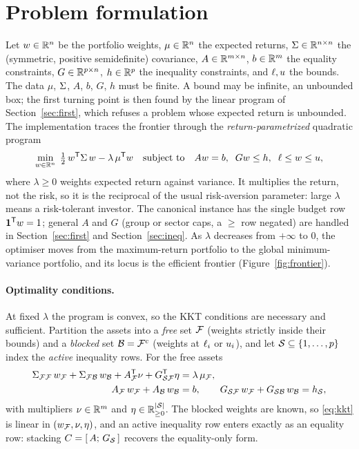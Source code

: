 \section{Problem formulation}
\label{sec:problem}

Let $w\in\mathbb{R}^n$ be the portfolio weights, $\mu\in\mathbb{R}^n$ the expected returns,
$\Sigma\in\mathbb{R}^{n\times n}$ the (symmetric, positive semidefinite) covariance,
$A\in\mathbb{R}^{m\times n}$, $b\in\mathbb{R}^m$ the equality constraints, $G\in\mathbb{R}^{p\times n}$,
$h\in\mathbb{R}^p$ the inequality constraints, and $\ell,u$ the bounds. The data $\mu$,
$\Sigma$, $A$, $b$, $G$, $h$ must be finite. A bound may be infinite, an unbounded box;
the first turning point is then found by the linear program of Section~\ref{sec:first}, which
refuses a problem whose expected return is unbounded. The
implementation traces the frontier through the \emph{return-parametrized} quadratic
program
\begin{equation}
\label{eq:qp}
\min_{w\in\mathbb{R}^n}\; \tfrac12\, w^{\mathsf{T}} \Sigma\, w - \lambda\,\mu^{\mathsf{T}} w
\quad\text{subject to}\quad A w = b,\;\; G w \le h,\;\; \ell \le w \le u,
\end{equation}
where $\lambda \ge 0$ weights expected return against variance. It multiplies the
return, not the risk, so it is the reciprocal of the usual risk-aversion parameter:
large $\lambda$ means a risk-tolerant investor. The canonical instance
has the single budget row $\mathbf{1}^{\mathsf{T}} w = 1$; general $A$ and $G$ (group or sector
caps, a $\ge$ row negated) are handled in Section~\ref{sec:first} and Section~\ref{sec:ineq}. As $\lambda$ decreases from $+\infty$ to $0$, the optimiser moves from the
maximum-return portfolio to the global minimum-variance portfolio, and its locus is the
efficient frontier (Figure~\ref{fig:frontier}).


\paragraph{Optimality conditions.}
At fixed $\lambda$ the program is convex, so the KKT conditions are necessary and
sufficient. Partition the assets into a \emph{free} set $\mathcal{F}$ (weights strictly inside
their bounds) and a \emph{blocked} set $\mathcal{B} = \mathcal{F}^{c}$ (weights at $\ell_i$ or $u_i$),
and let $\mathcal{S} \subseteq \{1,\dots,p\}$ index the \emph{active} inequality rows. For
the free assets
\begin{equation}
\label{eq:kkt}
\begin{aligned}
\Sigma_{\mathcal{F}\mathcal{F}}\, w_{\mathcal{F}} + \Sigma_{\mathcal{F}\mathcal{B}}\, w_{\mathcal{B}} + A_{\mathcal{F}}^{\mathsf{T}} \nu + G_{\mathcal{S}\mathcal{F}}^{\mathsf{T}} \eta
  &= \lambda\, \mu_{\mathcal{F}},\\
A_{\mathcal{F}}\, w_{\mathcal{F}} + A_{\mathcal{B}}\, w_{\mathcal{B}} &= b, \qquad
G_{\mathcal{S}\mathcal{F}}\, w_{\mathcal{F}} + G_{\mathcal{S}\mathcal{B}}\, w_{\mathcal{B}} = h_{\mathcal{S}},
\end{aligned}
\end{equation}
with multipliers $\nu\in\mathbb{R}^m$ and $\eta\in\mathbb{R}^{|\mathcal{S}|}_{\ge 0}$. The blocked weights
are known, so \eqref{eq:kkt} is linear in $(w_{\mathcal{F}},\nu,\eta)$, and an active inequality
row enters exactly as an equality row: stacking $C = [\,A;\,G_{\mathcal{S}}\,]$ recovers the
equality-only form.

